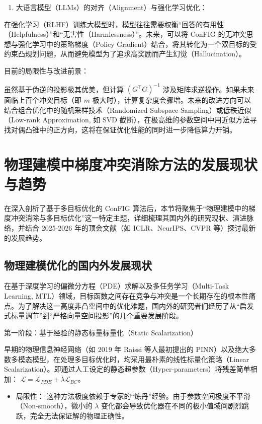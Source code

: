\documentclass[UTF8,a4paper,12pt,fontset=none]{ctexart}
\begin{document}
\begin{enumerate}
\item 大语言模型（LLMs）的对齐（Alignment）与强化学习优化：
\end{enumerate}
    在强化学习（RLHF）训练大模型时，模型往往需要权衡“回答的有用性（Helpfulness）”和“无害性（Harmlessness）”。未来，可以将 ConFIG 的无冲突思想与强化学习中的策略梯度（Policy Gradient）结合，将其转化为一个双目标的受约束凸规划问题，从而避免模型为了追求高奖励而产生幻觉（Hallucination）。


目前的局限性与改进前景：

虽然基于伪逆的投影极其优美，但计算 $(G^\top G)^{-1}$ 涉及矩阵求逆操作。如果未来面临上百个冲突目标（即 $m$ 极大时），计算复杂度会骤增。未来的改进方向可以结合组合优化中的随机采样技术（Randomized Subspace Sampling）或低秩近似（Low-rank Approximation, 如 SVD 截断），在极高维的参数空间中用近似方法寻找对偶凸锥中的正方向，这将在保证优化性能的同时进一步降低算力开销。




\section{物理建模中梯度冲突消除方法的发展现状与趋势}

在深入剖析了基于多目标优化的 ConFIG 算法后，本节将聚焦于“物理建模中的梯度冲突消除与多目标优化”这一特定主题，详细梳理其国内外的研究现状、演进脉络，并结合 2025-2026 年的顶会文献（如 ICLR、NeurIPS、CVPR 等）探讨最新的发展趋势。


\subsection{物理建模优化的国内外发展现状}

在基于深度学习的偏微分方程（PDE）求解以及多任务学习（Multi-Task Learning, MTL）领域，目标函数之间存在竞争与冲突是一个长期存在的根本性痛点。为了解决这一高度非凸空间中的优化难题，国内外的研究者们经历了从“启发式标量调节”到“严格向量空间投影”的几个重要发展阶段。


第一阶段：基于经验的静态标量标量化（Static Scalarization）

早期的物理信息神经网络（如 2019 年 Raissi 等人最初提出的 PINN）以及绝大多数多模态模型，在处理多目标优化时，均采用最朴素的线性标量化策略（Linear Scalarization）。即通过人工设定的静态超参数（Hyper-parameters）将残差简单相加： $\mathcal{L} = \mathcal{L}_{PDE} + \lambda \mathcal{L}_{BC}$。

\begin{itemize}
\item 局限性： 这种方法极度依赖于专家的“炼丹”经验。由于参数空间极度不平滑（Non-smooth），微小的 $\lambda$ 变化都会导致优化器在不同的极小值域间剧烈跳跃，完全无法保证解的物理正确性。
\end{itemize}
\end{document}
